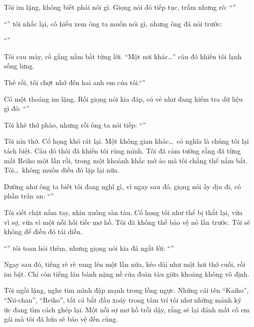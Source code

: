 \documentclass[../main.tex]{subfiles}
\begin{document}
Tôi im lặng, không biết phải nói gì. Giọng nói đó tiếp tục, trầm nhưng rõ: ``''

``'' tôi nhắc lại, cố hiểu xem ông ta muốn nói gì, nhưng ông đã nói trước:

``''

Tôi cau mày, cố gắng nắm bắt từng lời. ``Một nơi khác\dots'' câu đó khiến tôi lạnh sống lưng.

Thế rồi, tôi chợt nhớ đến hai anh em của tôi.``''

Có một thoáng im lặng. Rồi giọng nói kia đáp, có vẻ như đang kiểm tra dữ liệu gì đó: ``''

Tôi khẽ thở phào, nhưng rồi ông ta nói tiếp: ``''

Tôi nín thở. Cổ họng khô rát lại. Một không gian khác\dots\ có nghĩa là chúng tôi lại tách biệt. Câu đó thôi đã khiến tôi rùng mình. Tôi đã cảm tưởng rằng đã từng mất Reiko một lần rồi, trong một khoảnh khắc mờ ảo mà tôi chẳng thể nắm bắt. Tôi\dots\ không muốn điều đó lặp lại nữa.

Dường như ông ta biết tôi đang nghĩ gì, vì ngay sau đó, giọng nói ấy dịu đi, có phần trấn an: ``''

Tôi siết chặt nắm tay, nhìn xuống sàn tàu. Cổ họng tôi như thể bị thắt lại, vừa vì sợ, vừa vì một nỗi hối tiếc mơ hồ. Tôi đã không thể bảo vệ nó lần trước. Tôi sẽ không để điều đó tái diễn.

``'' tôi toan hỏi thêm, nhưng giọng nói kia đã ngắt lời: ``''

Ngay sau đó, tiếng rè rè vang lên một lần nữa, kéo dài như một hơi thở cuối, rồi im bặt. Chỉ còn tiếng lăn bánh nặng nề của đoàn tàu giữa khoảng không vô định.

Tôi ngồi lặng, nghe tim mình đập mạnh trong lồng ngực. Những cái tên ``Kaiho'', ``Nii-chan'', ``Reiko'', tất cả bắt đầu xoáy trong tâm trí tôi như những mảnh ký ức đang tìm cách ghép lại. Một nỗi sợ mơ hồ trỗi dậy, rằng sẽ lại đánh mất cô em gái mà tôi đã hứa sẽ bảo vệ đến cùng.
\end{document}
